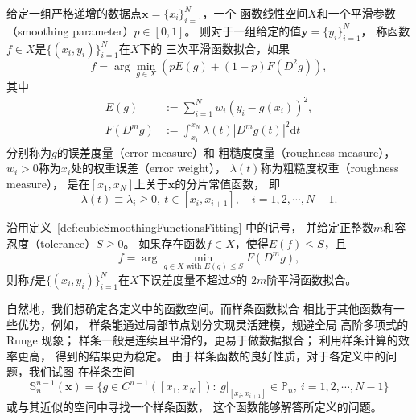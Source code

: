 \begin{defn}
  \label{def:cubicSmoothingFunctionsFitting}
  给定一组严格递增的数据点$\mathbf{x}=\{x_{i}\}_{i=1}^{N}$，一个
  函数线性空间$X$和一个平滑参数（smoothing parameter）$p\in [0,1]$。
  则对于一组给定的值$\mathbf{y}=\{y_{i}\}_{i=1}^{N}$，
  称函数$f\in X$是$\{(x_{i},y_{i})\}_{i=1}^{N}$在$X$下的
  三次平滑函数拟合\cite{GuideToSplines}，如果
  \begin{equation}
    \label{eq:cubicSmoothingSpline}
    f= \arg\min_{g\in X}\left( pE(g)+(1-p)F(D^{2}g)\right),
  \end{equation}
  其中
  \begin{align}
    \label{eq:errorMeasure}
    E(g)&:=\sum_{i=1}^{N}w_{i}(y_{i}-g(x_{i}))^{2},\\
    \label{eq:roughnessMeasure}
    F(D^{m}g)&:=\int_{x_{1}}^{x_{N}}
               \lambda(t)|D^{m}g(t)|^{2}\mathrm{d}t
  \end{align}
  分别称为$g$的误差度量（error measure）和
  粗糙度度量（roughness measure），
  $w_{i}>0$称为$x_{i}$处的权重误差（error weight），
  $\lambda(t)$称为粗糙度权重（roughness measure），
  是在$[x_{1},x_{N}]$上关于$\mathbf{x}$的分片常值函数，
  即
  \begin{equation}
    \label{eq:lambdat}
    \lambda(t)\equiv \lambda_{i}\ge 0,\
  t\in [x_{i},x_{i+1}],\quad i=1,2,\cdots,N-1.
  \end{equation}
\end{defn}

\begin{defn}
  \label{def:smoothingFunctionsFitting}
  沿用定义~\ref{def:cubicSmoothingFunctionsFitting} 中的记号，
  并给定正整数$m$和容忍度（tolerance）$S\ge 0$。
  如果存在函数$f\in X$，使得$E(f)\le S$，且
  \begin{equation}
    \label{eq:smoothingFunctionsFitting}
    f = \arg \min_{g\in X\text{ with } E(g)\le S} F(D^{m}g),
  \end{equation}
  则称$f$是$\{(x_{i},y_{i})\}_{i=1}^{N}$在$X$下误差度量不超过$S$的
  $2m$阶平滑函数拟合。\cite{SmoothingBySplineFunctions}
\end{defn}

自然地，我们想确定各定义中的函数空间。而样条函数拟合
相比于其他函数有一些优势，例如，
样条能通过局部节点划分实现灵活建模，规避全局
高阶多项式的 Runge 现象\cite{GuideToSplines,hastie2009elements}；
样条一般是连续且平滑的，更易于做数据拟合\cite{green1993nonparametric}；
利用样条计算的效率更高，
得到的结果更为稳定\cite{GuideToSplines,hastie2009elements}。
由于样条函数的良好性质，对于各定义中的问题，我们试图
在样条空间
$$\mathbb{S}_{n}^{n-1}(\mathbf{x})
=\{g\in C^{n-1}([x_{1},x_{N}]):
  \ g|_{[x_{i},x_{i+1}]}\in \mathbb{P}_{n},\ i=1,2,\cdots,N-1\}$$
或与其近似的空间中寻找一个样条函数，
这个函数能够解答所定义的问题。

